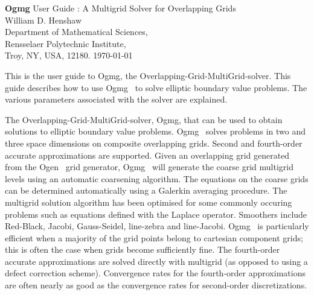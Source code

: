 \documentclass{article}
\begin{document}

\newcommand{\ogen}{\homeHenshaw/res/ogen}
\newcommand{\figures}{\homeHenshaw/Overture/docFigures}
\newcommand{\automg}{\homeHenshaw/papers/automg}
\newcommand{\ogmgDir}{\homeHenshaw/Overture/ogmg}

\newcommand{\Ogen}{{Ogen}}
\newcommand{\Overture}{{Overture}}
\newcommand{\Ogmg}{{Ogmg}}
\newcommand{\tablefontsize}{\footnotesize}




\baselineskip
\begin{flushleft}
{\Large
{\bf Ogmg} User Guide : A Multigrid Solver for Overlapping Grids \\
}
\vspace{2\baselineskip}
William D. Henshaw  \\
Department of Mathematical Sciences, \\
Rensselaer Polytechnic Institute, \\
Troy, NY, USA, 12180.
\vspace{\baselineskip}
\today\\
\vspace{\baselineskip}

\vspace{4\baselineskip}


This is the user guide to \Ogmg, the Overlapping-Grid-MultiGrid-solver. This guide
describes how to use \Ogmg~ to solve elliptic boundary value problems. The various
parameters associated with the solver are explained.


The Overlapping-Grid-MultiGrid-solver, \Ogmg, that can be used to obtain solutions 
to elliptic boundary value problems.
\Ogmg~ solves problems in two and three space
dimensions on composite overlapping grids. 
Second and fourth-order accurate approximations are supported.
Given an overlapping grid generated from the \Ogen~  grid generator,
\Ogmg~  will generate the coarse grid multigrid levels using an automatic coarsening algorithm.
The equations on the coarse grids can be determined automatically using a Galerkin averaging
procedure.
The multigrid solution algorithm has been optimised for some commonly occuring problems such as
equations defined with the Laplace operator.
Smoothers include Red-Black, Jacobi, Gauss-Seidel, line-zebra and line-Jacobi.
\Ogmg~  is particularly efficient when a majority of the grid points belong to cartesian component grids;
this is often the case when grids become sufficiently fine.
The fourth-order accurate approximations are solved directly with multigrid (as opposed to using
a defect correction scheme). Convergence rates for the fourth-order approximations are often nearly as
good as the convergence rates for second-order discretizations.
\end{flushleft}
\end{document}
